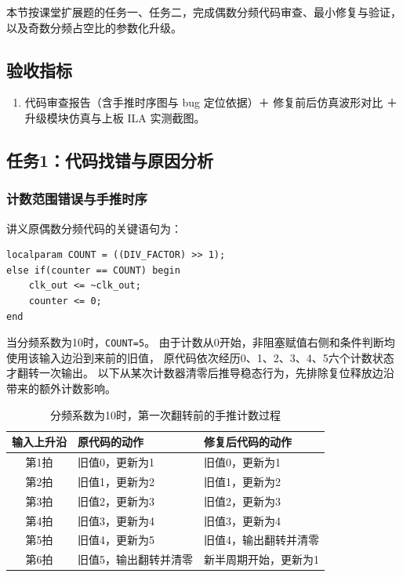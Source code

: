 本节按课堂扩展题的任务一、任务二，完成偶数分频代码审查、最小修复与验证，
以及奇数分频占空比的参数化升级。

\subsection{验收指标}
\begin{enumerate}
    \item 代码审查报告（含手推时序图与 bug 定位依据）＋ 修复前后仿真波形对比 ＋ 升级模块仿真与上板 ILA 实测截图。
\end{enumerate}

\subsection{任务1：代码找错与原因分析}
\subsubsection{计数范围错误与手推时序}

讲义原偶数分频代码的关键语句为：
\begin{lstlisting}[style=vcode,caption={原代码的计数阈值}]
localparam COUNT = ((DIV_FACTOR) >> 1);
else if(counter == COUNT) begin
    clk_out <= ~clk_out;
    counter <= 0;
end
\end{lstlisting}

当分频系数为10时，\texttt{COUNT=5}。
由于计数从0开始，非阻塞赋值右侧和条件判断均使用该输入边沿到来前的旧值，
原代码依次经历0、1、2、3、4、5六个计数状态才翻转一次输出。
以下从某次计数器清零后推导稳态行为，先排除复位释放边沿带来的额外计数影响。

\begin{table}[H]
\centering
\caption{分频系数为10时，第一次翻转前的手推计数过程}
\begin{tabularx}{\textwidth}{cXX}
\toprule
输入上升沿 & 原代码的动作 & 修复后代码的动作\\
\midrule
第1拍 & 旧值0，更新为1 & 旧值0，更新为1\\
第2拍 & 旧值1，更新为2 & 旧值1，更新为2\\
第3拍 & 旧值2，更新为3 & 旧值2，更新为3\\
第4拍 & 旧值3，更新为4 & 旧值3，更新为4\\
第5拍 & 旧值4，更新为5 & 旧值4，输出翻转并清零\\
第6拍 & 旧值5，输出翻转并清零 & 新半周期开始，更新为1\\
\bottomrule
\end{tabularx}
\end{table}

